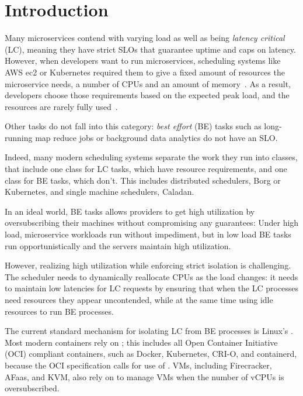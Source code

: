 \section{Introduction}
\label{s:intro}

Many microservices contend with varying load as well as being \textit{latency
critical} (LC), meaning they have strict SLOs that guarantee uptime and caps on
latency. However, when developers want to run microservices, scheduling systems
like AWS ec2 or Kubernetes required them to give a fixed amount of resources the
microservice needs, \ie{} a number of CPUs and an amount of memory~\cite{TODO}.
As a result, developers choose those requirements based on the expected peak
load, and the resources are rarely fully used~\cite{TODO}. 

Other tasks do not fall into this category: \textit{best effort} (BE) tasks such
as long-running map reduce jobs or background data analytics do not have an SLO.

Indeed, many modern scheduling systems separate the work they run into classes,
that include one class for LC tasks, which have resource requirements, and one
class for BE tasks, which don't. This includes distributed schedulers, \eg{}
Borg\cite{TODO} or Kubernetes\cite{TODO}, and single machine schedulers, \eg{}
Caladan\cite{TODO}. 

In an ideal world, BE tasks allows providers to get high utilization by
oversubscribing their machines without compromising any guarantees: Under high
load, microservice workloads run without impediment, but in low load BE tasks
run opportunistically and the servers maintain high utilization.

However, realizing high utilization while enforcing strict isolation is
challenging. The scheduler needs to dynamically reallocate CPUs as the load
changes: it needs to maintain low latencies for LC requests by ensuring that
when the LC processes need resources they appear uncontended, while at the same
time using idle resources to run BE processes.

The current standard mechanism for isolating LC from BE processes is Linux's
\cgroups{}. Most modern containers rely on \cgroups{}; this includes all Open
Container Initiative (OCI) compliant containers, such as Docker, Kubernetes,
CRI-O, and containerd, because the OCI specification calls for use of
\cgroups{}. VMs, including Firecracker, AFaas, and KVM, also rely on \cgroups{}
to manage VMs when the number of vCPUs is oversubscribed.~\cite{TODO}

